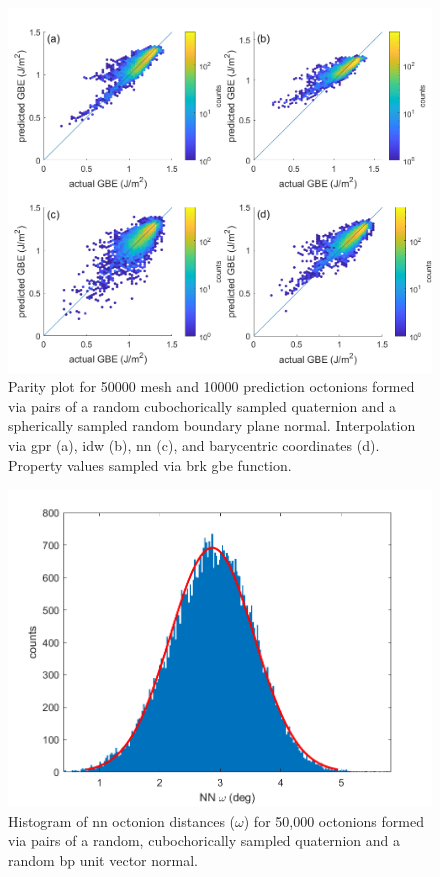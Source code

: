 \documentclass[preprint,12pt]{elsarticle}
\begin{document}
\begin{figure}
    \centering
    \includegraphics{brkparity50000.png}
    \caption{Parity plot for 50000 mesh and 10000 prediction octonions formed via pairs of a random cubochorically sampled quaternion and a spherically sampled random boundary plane normal. Interpolation via \acrlong{gpr} (a), \acrlong{idw} (b), \acrlong{nn} (c), and barycentric coordinates (d). Property values sampled via \acrlong{brk} \acrlong{gbe} function.}
    \label{fig:brkparity50000}
\end{figure}

\begin{figure}
    \centering
    \includegraphics{disthist50000.png}
    \caption{Histogram of \acrfull{nn} octonion distances ($\omega$) for 50,000 octonions formed via pairs of a random, cubochorically sampled quaternion and a random \acrfull{bp} unit vector normal.}
    \label{fig:nndist}
\end{figure}
\end{document}
